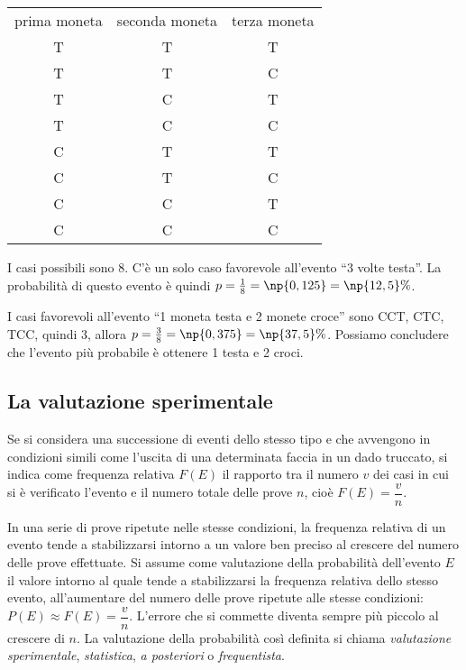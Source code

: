 \begin{exrig}
\begin{esempio}
\begin{center}
\begin{tabular}{ccc}
prima moneta & seconda moneta & terza moneta\\
T & T & T\\
T & T & C\\
T & C & T\\
T & C & C\\
C & T & T\\
C & T & C\\
C & C & T\\
C & C & C\\
\end{tabular}
\end{center}
I casi possibili sono 8. C'è un solo caso favorevole all'evento ``3 volte testa''. La probabilità di questo evento è quindi $p=\frac 1 8=\np{0,125}=\np{12,5}\%$.

I casi favorevoli all'evento ``1 moneta testa e 2 monete croce'' sono CCT, CTC, TCC, quindi 3, allora $p=\frac 3 8=\np{0,375}=\np{37,5}\%$. Possiamo concludere che l'evento più probabile è ottenere 1 testa e 2 croci.
\end{esempio}
\end{exrig}

\subsection{La valutazione sperimentale}

Se si considera una successione di eventi dello stesso tipo e che avvengono in condizioni simili come l'uscita di una determinata faccia in un dado truccato, si indica come frequenza relativa $F(E)$ il rapporto tra il numero $v$ dei casi in cui si è verificato l'evento e il numero totale delle prove $n$, cioè $F(E)=\dfrac v n$.

In una serie di prove ripetute nelle stesse condizioni, la frequenza relativa di un evento tende a stabilizzarsi intorno a un valore ben preciso al crescere del numero delle prove effettuate.
Si assume come valutazione della probabilità dell'evento $E$ il valore intorno al quale tende a stabilizzarsi la frequenza relativa dello stesso evento, all'aumentare del numero delle prove ripetute alle stesse condizioni: $P(E)\approx F(E)=\dfrac v n$.
L'errore che si commette diventa sempre più piccolo al crescere di $n$. La valutazione della probabilità così definita si chiama \emph{valutazione sperimentale}, \emph{statistica}, \emph{a posteriori} o \emph{frequentista}.

